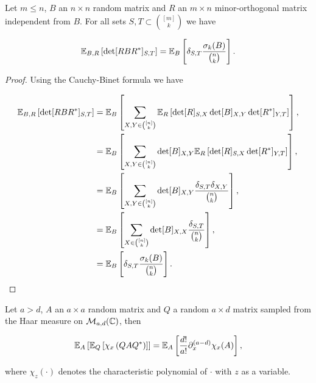 \begin{lemma} \label{lemma:conjugate_minorth}
    Let $m \le n$, $B$ an $n\times n$ random matrix and $R$ an $m\times n$ minor-orthogonal matrix independent from $B$. For all sets $S,T \subset \binom{[m]}{k}$ we have

    \begin{equation*}
        \mathbb E_{B,R} \left[ \det[RBR^*]_{S,T} \right] = \mathbb E_B \left[\delta_{S,T} \frac{\sigma_k(B)}{\binom{n}k}\right].
    \end{equation*}
\end{lemma}

\begin{proof}
    Using the Cauchy-Binet formula we have

    \begin{align*}
        \mathbb E_{B,R} \left[ \det[RBR^*]_{S,T} \right] &= \mathbb E_B \left[\sum_{X,Y \in \binom{[n]}{k}} \mathbb E_R \left[ \det[R]_{S,X} \det[B]_{X,Y} \det[R^*]_{Y,T} \right] \right],\\ 
        &= \mathbb E_B \left[\sum_{X,Y \in \binom{[n]}{k}} \det[B]_{X,Y} \mathbb E_R \left[ \det[R]_{S,X} \det[R^*]_{Y,T} \right] \right],\\ 
        &= \mathbb E_B \left[\sum_{X,Y \in \binom{[n]}{k}} \det[B]_{X,Y} \frac{\delta_{S,T} \delta_{X,Y}}{\binom{n}{k}} \right],\\ 
        &= \mathbb E_B \left[\sum_{X \in \binom{[n]}{k}} \det [B]_{X,X} \frac{\delta_{S,T}}{\binom{n}{k}} \right],\\
        &= \mathbb E_B \left[\delta_{S,T} \frac{\sigma_k(B)}{\binom{n}k}\right].
    \end{align*}
\end{proof}


\begin{lemma}
    Let $a > d$, $A$ an $a \times a$ random matrix and $Q$ a random $a \times d$ matrix sampled from the Haar measure on $\mathcal M_{a,d}(\mathbb C)$, then

    \begin{equation*}
        \mathbb E_A \left[ \mathbb E_Q\left[ \chi_x \left( Q A Q^* \right) \right]\right] = \mathbb E_A \left[\frac{d!}{a!} \partial_x^{(a-d)} \chi_x(A) \right],
    \end{equation*}

    \noindent where $\chi_z(\cdot)$ denotes the characteristic polynomial of $\cdot$ with $z$ as a variable.
\end{lemma}

